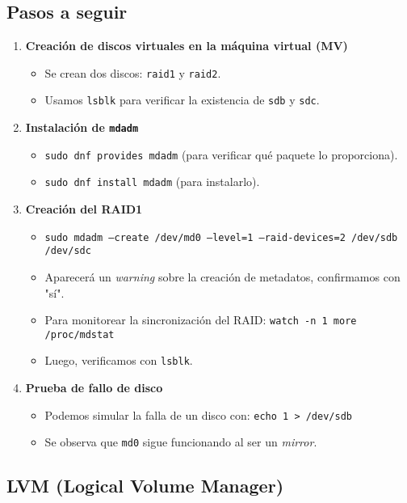 \subsection{Pasos a seguir}
\begin{enumerate}
    \item \textbf{Creación de discos virtuales en la máquina virtual (MV)}
    \begin{itemize}
        \item Se crean dos discos: \texttt{raid1} y \texttt{raid2}.
        \item Usamos \texttt{lsblk} para verificar la existencia de \texttt{sdb} y \texttt{sdc}.
    \end{itemize}

    \item \textbf{Instalación de \texttt{mdadm}}
    \begin{itemize}
        \item \texttt{sudo dnf provides mdadm} (para verificar qué paquete lo proporciona).
        \item \texttt{sudo dnf install mdadm} (para instalarlo).
    \end{itemize}

    \item \textbf{Creación del RAID1}
    \begin{itemize}
        \item \texttt{sudo mdadm --create /dev/md0 --level=1 --raid-devices=2 /dev/sdb /dev/sdc}
        \item Aparecerá un \textit{warning} sobre la creación de metadatos, confirmamos con "sí".
        \item Para monitorear la sincronización del RAID:  
              \texttt{watch -n 1 more /proc/mdstat}
        \item Luego, verificamos con \texttt{lsblk}.
    \end{itemize}

    \item \textbf{Prueba de fallo de disco}
    \begin{itemize}
        \item Podemos simular la falla de un disco con:  
              \texttt{echo 1 > /dev/sdb}
        \item Se observa que \texttt{md0} sigue funcionando al ser un \textit{mirror}.
    \end{itemize}
\end{enumerate}

\subsection{LVM (Logical Volume Manager)}

